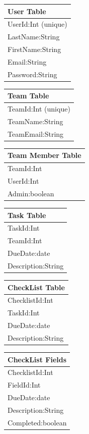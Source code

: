 \documentclass{article}
\begin{document}
\begin{tabular}{|l|} \hline
    \textbf{User Table} \\ \hline
    UserId:Int (unique)\\
    LastName:String\\
    FirstName:String\\
    Email:String\\
    Password:String\\ \hline
\end{tabular}
\hfill
\begin{tabular}{|l|} \hline
    \textbf{Team Table} \\ \hline
    TeamId:Int (unique)\\
    TeamName:String \\
    TeamEmail:String\\ \hline
\end{tabular}

\begin{tabular}{|l|} \hline
    \textbf{Team Member Table} \\ \hline
    TeamId:Int\\
    UserId:Int\\
    Admin:boolean\\ \hline
\end{tabular}
\hfill
\begin{tabular}{|l|} \hline
    \textbf{Task Table} \\ \hline
    TaskId:Int\\
    TeamId:Int\\
    DueDate:date\\
    Description:String\\ \hline
\end{tabular}

\begin{tabular}{|l|} \hline
    \textbf{CheckList Table} \\ \hline
    ChecklistId:Int\\
    TaskId:Int\\
    DueDate:date\\
    Description:String\\ \hline
\end{tabular}
\hfill
\begin{tabular}{|l|} \hline
    \textbf{CheckList Fields} \\ \hline
    ChecklistId:Int\\
    FieldId:Int\\
    DueDate:date\\
    Description:String\\
    Completed:boolean\\ \hline
\end{tabular}
\end{document}
